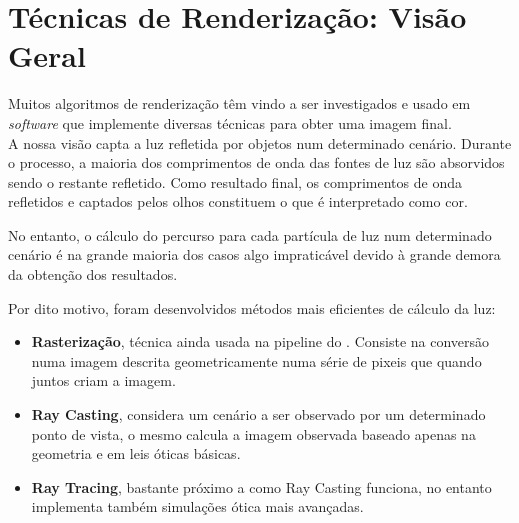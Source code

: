 



\section{Técnicas de Renderização: Visão Geral}
\label{sec::arte:render}

Muitos algoritmos de renderização têm vindo a ser investigados e usado em \textit{software} que implemente diversas técnicas para obter uma imagem final.\\


A nossa visão capta a luz refletida por objetos num determinado cenário. Durante o processo, a maioria dos comprimentos de onda das fontes de luz são absorvidos sendo o restante refletido. Como resultado final, os comprimentos de onda refletidos e captados pelos olhos constituem o que é interpretado como cor.

No entanto, o cálculo do percurso para cada partícula de luz num determinado cenário é na grande maioria dos casos algo impraticável devido à grande demora da obtenção dos resultados.

Por dito motivo, foram desenvolvidos métodos mais eficientes de cálculo da luz:
\begin{itemize}
    \item \textbf{Rasterização}, técnica ainda usada na pipeline do \opengl. Consiste na conversão numa imagem descrita geometricamente numa série de pixeis que quando juntos criam a imagem.
    
    \item \textbf{Ray Casting}, considera um cenário a ser observado por um determinado ponto de vista, o mesmo calcula a imagem observada baseado apenas na geometria e em leis óticas básicas.
    
    \item \textbf{Ray Tracing}, bastante próximo a como Ray Casting funciona, no entanto implementa também simulações ótica mais avançadas.
\end{itemize}

\\


